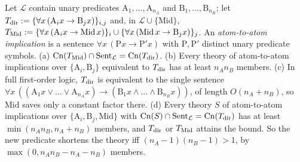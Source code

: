 \begin{proposition}\label{prop:terms:factoring}
Let $\mathcal L$ contain unary predicates $\mathrm A_1,\dots,\mathrm A_{n_A}$ and $\mathrm B_1,\dots,\mathrm B_{n_B}$; let $T_{\rm dir}:=\{\forall x\,(\mathrm A_ix\to\mathrm B_jx)\}_{i,j}$ and, in $\mathcal L\cup\{\mathrm{Mid}\}$, $T_{\rm Mid}:=\{\forall x\,(\mathrm A_ix\to\mathrm{Mid}\,x)\}_i\cup\{\forall x\,(\mathrm{Mid}\,x\to\mathrm B_jx)\}_j$. An \emph{atom-to-atom implication} is a sentence $\forall x\,(\mathrm Px\to\mathrm P'x)$ with $\mathrm P,\mathrm P'$ distinct unary predicate symbols.
(a) $\mathrm{Cn}(T_{\rm Mid})\cap\mathrm{Sent}_{\mathcal L}=\mathrm{Cn}(T_{\rm dir})$.
(b) Every theory of atom-to-atom implications over $\{\mathrm A_i,\mathrm B_j\}$ equivalent to $T_{\rm dir}$ has at least $n_An_B$ members.
(c) In full first-order logic, $T_{\rm dir}$ is equivalent to the single sentence $\forall x\,((\mathrm A_1x\vee\dots\vee\mathrm A_{n_A}x)\to(\mathrm B_1x\wedge\dots\wedge\mathrm B_{n_B}x))$, of length $O(n_A+n_B)$, so $\mathrm{Mid}$ saves only a constant factor there.
(d) Every theory $S$ of atom-to-atom implications over $\{\mathrm A_i,\mathrm B_j,\mathrm{Mid}\}$ with $\mathrm{Cn}(S)\cap\mathrm{Sent}_{\mathcal L}=\mathrm{Cn}(T_{\rm dir})$ has at least $\min(n_An_B,n_A+n_B)$ members, and $T_{\rm dir}$ or $T_{\rm Mid}$ attains the bound. So the new predicate shortens the theory iff $(n_A-1)(n_B-1)>1$, by $\max(0,n_An_B-n_A-n_B)$ members.
\end{proposition}

